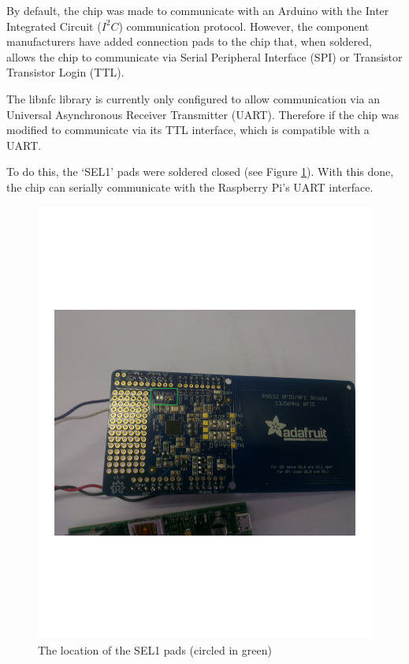 By default, the chip was made to communicate with an Arduino with the Inter
Integrated Circuit ($I^2C$) communication protocol. However, the component
manufacturers have added connection pads to the chip that, when soldered, allows
the chip to communicate via Serial Peripheral Interface (SPI) or Transistor
Transistor Login (TTL). 

The libnfc library is currently only configured to allow communication via an
Universal Asynchronous Receiver Transmitter (UART). Therefore if the chip was
modified to communicate via its TTL interface, which is compatible with a UART. 

To do this, the `SEL1' pads were soldered closed (see Figure
\ref{fig:nfc-chip-solder}). With this done, the chip can serially communicate
with the Raspberry Pi's UART interface.

\begin{figure}
 \centering 
 \includegraphics[clip=true, trim = 0 250 0 270,
 scale=0.7]{soldeer_pic}
 \caption{The location of the SEL1 pads (circled in green)}
 \label{fig:nfc-chip-solder}
\end{figure}


